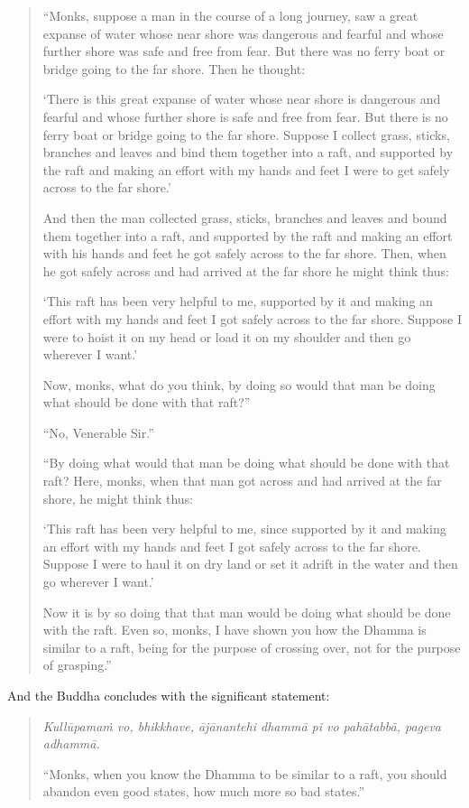 \begin{quote}
``Monks, suppose a man in the course of a long journey, saw a great expanse of water whose near shore was dangerous and fearful and whose further shore was safe and free from fear. But there was no ferry boat or bridge going to the far shore. Then he thought:

`There is this great expanse of water whose near shore is dangerous and fearful and whose further shore is safe and free from fear. But there is no ferry boat or bridge going to the far shore. Suppose I collect grass, sticks, branches and leaves and bind them together into a raft, and supported by the raft and making an effort with my hands and feet I were to get safely across to the far shore.'

And then the man collected grass, sticks, branches and leaves and bound them together into a raft, and supported by the raft and making an effort with his hands and feet he got safely across to the far shore. Then, when he got safely across and had arrived at the far shore he might think thus:

`This raft has been very helpful to me, supported by it and making an effort with my hands and feet I got safely across to the far shore. Suppose I were to hoist it on my head or load it on my shoulder and then go wherever I want.'

Now, monks, what do you think, by doing so would that man be doing what should be done with that raft?''

``No, Venerable Sir.''

``By doing what would that man be doing what should be done with that raft? Here, monks, when that man got across and had arrived at the far shore, he might think thus:

`This raft has been very helpful to me, since supported by it and making an effort with my hands and feet I got safely across to the far shore. Suppose I were to haul it on dry land or set it adrift in the water and then go wherever I want.'

Now it is by so doing that that man would be doing what should be done with the raft. Even so, monks, I have shown you how the Dhamma is similar to a raft, being for the purpose of crossing over, not for the purpose of grasping.''
\end{quote}

And the Buddha concludes with the significant statement:

\begin{quote}
\emph{Kullūpamaṁ vo, bhikkhave, ājānantehi dhammā pi vo pahātabbā, pageva adhammā.}

``Monks, when you know the Dhamma to be similar to a raft, you should abandon even good states, how much more so bad states.''
\end{quote}

